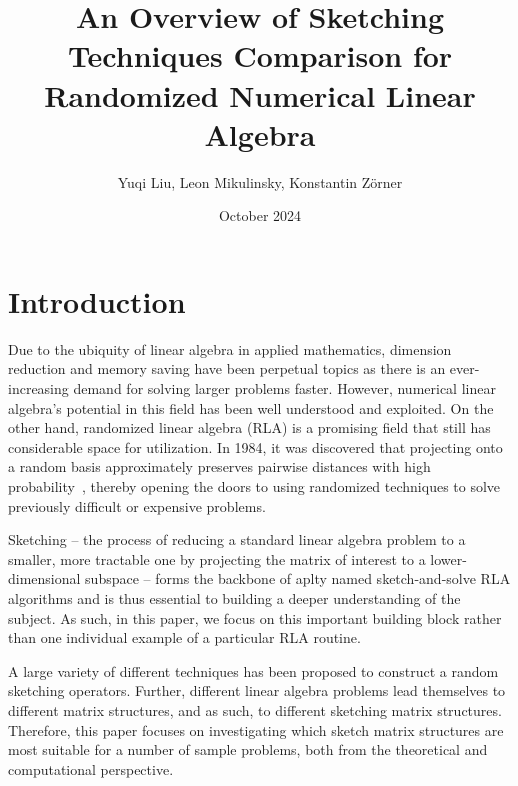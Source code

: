 \documentclass{article}
\title{An Overview of Sketching Techniques Comparison for Randomized Numerical Linear Algebra}
\author{Yuqi Liu, Leon Mikulinsky, Konstantin Zörner}
\date{October 2024}
\begin{document}
\maketitle

\section{Introduction}
Due to the ubiquity of linear algebra in applied mathematics, dimension reduction and memory saving have been  perpetual topics as there is an ever-increasing demand for solving larger problems faster. However, numerical linear algebra's potential in this field has been well understood and exploited. On the other hand, randomized linear algebra (RLA) is a promising field that still has considerable space for utilization. In 1984, it was discovered that projecting onto a random basis approximately preserves pairwise distances with high probability~\cite{beals1984conference}, thereby opening the doors to using randomized techniques to solve previously difficult or expensive problems.

Sketching -- the process of reducing a standard linear algebra problem to a smaller, more tractable one by projecting the matrix of interest to a lower-dimensional subspace --  forms the backbone of aplty named sketch-and-solve RLA algorithms and is thus essential to building a deeper understanding of the subject. As such, in this paper, we focus on this important building block rather than one individual example of a particular RLA routine. 

A large variety of different techniques has been proposed to construct a random sketching operators. Further, different linear algebra problems lead themselves to different matrix structures, and as such, to different sketching matrix structures. Therefore, this paper focuses on investigating which sketch matrix structures are most suitable for a number of sample problems, both from the theoretical and computational perspective.


\end{document}
